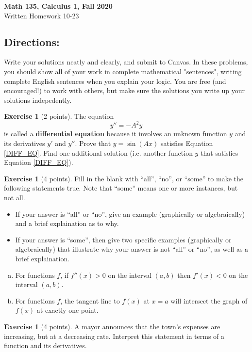 \documentclass[11pt,reqno,final]{amsart}
\numberwithin{figure}{section}
\theoremstyle{definition} %
\newtheorem{exercise}[question]{Exercise}
\begin{document}
\begin{center}
        \textbf{\Large Math 135, Calculus 1, Fall 2020}\\[10pt]
        {\large Written Homework 10-23}
\end{center}

\thispagestyle{empty}

\renewcommand{\thesection}{\Alph{section}}

\subsection*{Directions:}
Write your solutions neatly and clearly, and submit to Canvas.
In these problems, you should show all of your work in complete mathematical "sentences", writing complete English sentences when you explain your logic.
You are free (and encouraged!) to work with others, but make sure the solutions you write up your solutions indepedently.

\begin{exercise}[2 points]
        The equation
        \begin{equation}
                \label{DIFF_EQ}
                y'' = - A^2y
        \end{equation}
        is called a \textbf{differential equation}
        because it involves an unknown function $y$ and its derivatives $y'$ and $y''$.
        Prove that $y = \sin(Ax)$ satisfies Equation \cref{DIFF_EQ}.
        Find one additional solution (i.e. another function $y$ that satisfies Equation \cref{DIFF_EQ}).
\end{exercise}

\begin{exercise}[4 points]
        Fill in the blank with ``all'', ``no'', or ``some'' to make the following statements true.
        Note that ``some'' means one or more instances, but not all.

        \begin{itemize}
        \item If your answer is ``all'' or ``no'', give an example (graphically or algebraically) and a brief explaination as to why.
        \item If your answer is ``some'', then give two specific examples (graphically or algebraically) that illustrate why your answer is not ``all'' or ``no'', as well as a brief explaination.
        \end{itemize}

        \begin{enumerate}[(a)]
        \item For \underline{\qquad} functions $f$, if $f''(x) > 0$ on the interval $(a,b)$ then $f'(x) < 0$ on the interval $(a,b)$.
        \item For \underline{\qquad} functions $f$, the tangent line to $f(x)$ at $x = a$ will intersect the graph of $f(x)$ at exactly one point.
        \end{enumerate}
\end{exercise}

\begin{exercise}[4 points]
        A mayor announces that the town's expenses are increasing, but at a decreasing rate. Interpret this statement in terms of a function and its derivatives.
\end{exercise}
\end{document}
